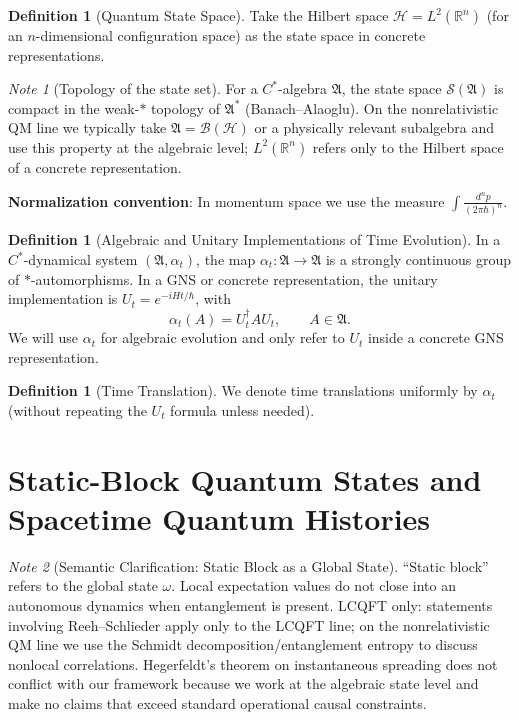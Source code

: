 \documentclass[11pt]{article}
\theoremstyle{definition}
\newtheorem{definition}[theorem]{Definition}
\theoremstyle{remark}
\newtheorem*{note}{Note}
\begin{document}
\begin{definition}[Quantum State Space]\label{def:statespace}
Take the Hilbert space \( \mathcal{H}=L^2(\mathbb{R}^n) \) (for an \( n \)-dimensional configuration space) as the state space in concrete representations.
\end{definition}

\begin{note}[Topology of the state set]
For a \( C^* \)-algebra \( \mathfrak{A} \), the state space \( \mathcal{S}(\mathfrak{A}) \) is compact in the weak-\( * \) topology of \( \mathfrak{A}^* \) (Banach--Alaoglu). On the nonrelativistic QM line we typically take \( \mathfrak{A}=\mathcal{B}(\mathcal{H}) \) or a physically relevant subalgebra and use this property at the algebraic level; \( L^2(\mathbb{R}^n) \) refers only to the Hilbert space of a concrete representation.

\textbf{Normalization convention}: In momentum space we use the measure \( \int \frac{d^n p}{(2\pi\hbar)^n} \).
\end{note}

\begin{definition}[Algebraic and Unitary Implementations of Time Evolution]\label{def:evolution}
In a \( C^* \)-dynamical system \( (\mathfrak{A},\alpha_t) \), the map \( \alpha_t: \mathfrak{A}\to\mathfrak{A} \) is a strongly continuous group of \( * \)-automorphisms. In a GNS or concrete representation, the unitary implementation is \( U_t=e^{-iHt/\hbar} \), with
\[
\alpha_t(A)=U_t^\dagger A U_t,\qquad A\in\mathfrak{A}.
\]
We will use \( \alpha_t \) for algebraic evolution and only refer to \( U_t \) inside a concrete GNS representation.
\end{definition}

\begin{definition}[Time Translation]\label{def:translation}
We denote time translations uniformly by \( \alpha_t \) (without repeating the \( U_t \) formula unless needed).
\end{definition}

\section{Static-Block Quantum States and Spacetime Quantum Histories}\label{sec:static}

\begin{note}[Semantic Clarification: Static Block as a Global State]
``Static block'' refers to the global state \( \omega \). Local expectation values do not close into an autonomous dynamics when entanglement is present. LCQFT only: statements involving Reeh--Schlieder apply only to the LCQFT line; on the nonrelativistic QM line we use the Schmidt decomposition/entanglement entropy to discuss nonlocal correlations. Hegerfeldt's theorem on instantaneous spreading does not conflict with our framework because we work at the algebraic state level and make no claims that exceed standard operational causal constraints.
\end{note}
\end{document}
